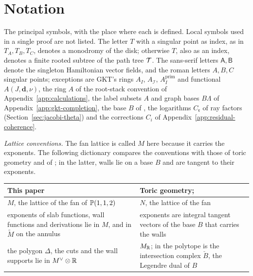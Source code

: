 \section{Notation}
\label{app:notation}

The principal symbols, with the place where each is defined.  Local symbols
used in a single proof are not listed.  The letter $T$ with a singular point
as index, as in $T_A,T_B,T_C$, denotes a monodromy of the disk; otherwise
$T$, also as an index, denotes a finite rooted subtree of the path tree
$\mathcal T$.  The sans-serif letters $\mathsf A,\mathsf B$ denote the singleton
Hamiltonian vector fields, and the roman letters $A,B,C$ singular points;
exceptions are GKT's rings $A_I$, $A_{\mathcal I}$, $A^{\mathrm{prim}}_I$ and
functional $A(J,\mathbf d,\nu)$, the ring $A$ of the root-stack convention
of Appendix~\ref{app:calculations}, the label subsets $A$ and graph bases
$B\Lambda$ of Appendix~\ref{app:gkt-completion}, the base $B$ of
\cite{grosssiebert2011,carletal2024}, the logarithms $C_{\mathfrak r}$ of ray
factors (Section~\ref{sec:jacobi-theta}) and the corrections $C_i$ of
Appendix~\ref{app:residual-coherence}.

\emph{Lattice conventions.}  The fan lattice is called $M$ here because it
carries the exponents.  The following dictionary compares the conventions
with those of toric geometry and of
\cite{grosssiebert2011,carletal2024}; in the latter, walls lie on a base $B$
and are tangent to their exponents.

\medskip
\noindent
\begin{tabularx}{\textwidth}{@{}p{}X@{}}
\toprule
This paper & Toric geometry; \cite{grosssiebert2011,carletal2024}\\
\midrule
$M$, the lattice of the fan of $\mathbb P(1,1,2)$ & $N$, the lattice of the
fan\\
exponents of slab functions, wall functions and derivations lie in $M$, and
in $\widetilde M$ on the annulus & exponents are integral tangent vectors of
the base $B$ that carries the walls\\
the polygon $\Delta$, the cuts and the wall supports lie in
$M^\vee\otimes\mathbb R$ & $M_\mathbb R$; in \cite[\S7.1]{carletal2024} the polytope is
the intersection complex $\check B$, the Legendre dual of $B$\\
\bottomrule
\end{tabularx}

